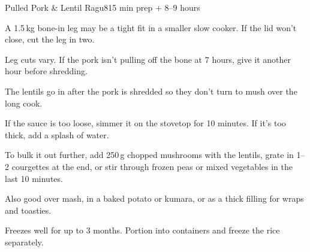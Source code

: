 \begin{recipebox}{Pulled Pork \& Lentil Ragu}{8}{15 min prep + 8--9 hours}
\begin{notelist}
  \item A 1.5\,kg bone-in leg may be a tight fit in a smaller slow cooker. If the
        lid won't close, cut the leg in two.
  \item Leg cuts vary. If the pork isn't pulling off the bone at 7 hours, give it
        another hour before shredding.
  \item The lentils go in after the pork is shredded so they don't turn to mush
        over the long cook.
  \item If the sauce is too loose, simmer it on the stovetop for 10 minutes. If
        it's too thick, add a splash of water.
  \item To bulk it out further, add 250\,g chopped mushrooms with the lentils,
        grate in 1--2 courgettes at the end, or stir through frozen peas or mixed
        vegetables in the last 10 minutes.
  \item Also good over mash, in a baked potato or kumara, or as a thick filling
        for wraps and toasties.
  \item Freezes well for up to 3 months. Portion into containers and freeze the
        rice separately.
\end{notelist}

\end{recipebox}
